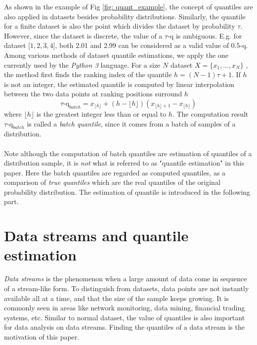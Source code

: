 As shown in the example of Fig \ref{fig: quant_example}, the concept of quantiles are also applied in datasets besides probability distributions. Similarly, the quantile for a finite dataset is also the point which divides the dataset by probability $\tau$. However, since the dataset is discrete, the value of a $\tau$-q is ambiguous. E.g. for dataset [$1,2,3,4$], both 2.01 and 2.99 can be considered as a valid value of $0.5$-q. Among various methods of dataset quantile estimations, we apply the one currently used by the \textit{Python 3} language. For a size $N$ dataset $X = \{x_1, ..., x_N\}$ , the method first finds the ranking index of the quantile $h = (N-1)\tau + 1$. If $h$ is not an integer, the estimated quantile is computed by linear interpolation between the two data points at ranking positions surround $h$
\begin{equation}
    \tau \text{-q}_{batch} = x_{\lfloor h\rfloor}+(h-\lfloor h\rfloor)\left(x_{\lfloor h\rfloor+1}-x_{\lfloor h\rfloor}\right)
\end{equation}
where $\lfloor h\rfloor$ is the greatest integer less than or equal to $h$. The computation result $\tau \text{-q}_{batch}$ is called a \textit{batch quantile}, since it comes from a batch of samples of a distribution.
\\\\
Note although the computation of batch quantiles are estimation of quantiles of a distribution sample, it is \textit{not} what is referred to as "quantile estimation" in this paper. Here the batch quantiles are regarded as computed quantiles, as a comparison of \textit{true quantiles} which are the real quantiles of the original probability distribution. The estimation of quantile is introduced in the following part.


\section{Data streams and quantile estimation}
\label{sec: intro_quant_est}

\textit{Data streams} is the phenomenon when a large amount of data come in sequence of a stream-like form. To distinguish from datasets, data points are not instantly available all at a time, and that the size of the sample keeps growing. It is commonly seen in areas like network monitoring, data mining, financial trading systems, etc. Similar to normal dataset, the value of quantiles is also important for data analysis on data streams. Finding the quantiles of a data stream is the motivation of this paper.

